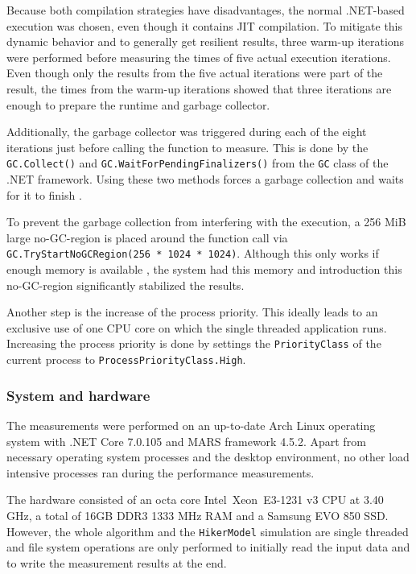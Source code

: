 			Because both compilation strategies have disadvantages, the normal .NET-based execution was chosen, even though it contains JIT compilation.
			To mitigate this dynamic behavior and to generally get resilient results, three warm-up iterations were performed before measuring the times of five actual execution iterations.
			Even though only the results from the five actual iterations were part of the result, the times from the warm-up iterations showed that three iterations are enough to prepare the runtime and garbage collector.
			
			Additionally, the garbage collector was triggered during each of the eight iterations just before calling the function to measure.
			This is done by the \texttt{GC.Collect()} and \texttt{GC.WaitForPendingFinalizers()} from the \texttt{GC} class of the .NET framework.
			Using these two methods forces a garbage collection and waits for it to finish \cite{ms-gc}.
			
			To prevent the garbage collection from interfering with the execution, a 256 MiB large no-GC-region is placed around the function call via \texttt{GC.TryStartNoGCRegion(256 * 1024 * 1024)}.
			Although this only works if enough memory is available \cite{ms-no-gc-region}, the system had this memory and introduction this no-GC-region significantly stabilized the results.
			
			Another step is the increase of the process priority.
			This ideally leads to an exclusive use of one CPU core on which the single threaded application runs.
			Increasing the process priority is done by settings the \texttt{PriorityClass} of the current process to \texttt{ProcessPriorityClass.High}.
		
		\subsubsection{System and hardware}
		
			The measurements were performed on an up-to-date Arch Linux operating system with .NET Core 7.0.105 and MARS framework 4.5.2.
			Apart from necessary operating system processes and the desktop environment, no other load intensive processes ran during the performance measurements.
			
			The hardware consisted of an octa core Intel\textregistered\ Xeon\textregistered\ E3-1231 v3 CPU at 3.40 GHz, a total of 16GB DDR3 1333 MHz RAM and a Samsung EVO 850 SSD.
			However, the whole algorithm and the \texttt{HikerModel} simulation are single threaded and file system operations are only performed to initially read the input data and to write the measurement results at the end.
	
